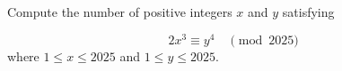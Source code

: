 Compute the number of positive integers $x$ and $y$ satisfying

$$2x^3\equiv y^4\quad\pmod{2025}$$where $1\leq x\leq 2025$ and $1\leq y\leq 2025$.
